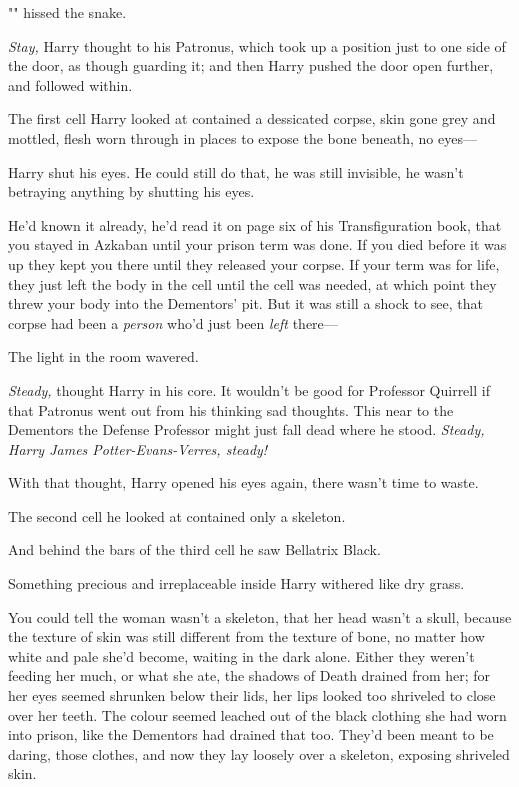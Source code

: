 "" hissed the snake.

\emph{Stay,} Harry thought to his Patronus, which took up a position just to
one side of the door, as though guarding it; and then Harry pushed the door
open further, and followed within.

The first cell Harry looked at contained a dessicated corpse, skin gone grey
and mottled, flesh worn through in places to expose the bone beneath, no eyes---

Harry shut his eyes. He could still do that, he was still invisible, he wasn't
betraying anything by shutting his eyes.

He'd known it already, he'd read it on page six of his Transfiguration book,
that you stayed in Azkaban until your prison term was done. If you died before
it was up they kept you there until they released your corpse. If your term was
for life, they just left the body in the cell until the cell was needed, at
which point they threw your body into the Dementors' pit. But it was still a
shock to see, that corpse had been a \emph{person} who'd just been \emph{left}
there---

The light in the room wavered.

\emph{Steady,} thought Harry in his core. It wouldn't be good for Professor
Quirrell if that Patronus went out from his thinking sad thoughts. This near to
the Dementors the Defense Professor might just fall dead where he stood.
\emph{Steady, Harry James Potter-Evans-Verres, steady!}

With that thought, Harry opened his eyes again, there wasn't time to waste.

The second cell he looked at contained only a skeleton.

And behind the bars of the third cell he saw Bellatrix Black.

Something precious and irreplaceable inside Harry withered like dry grass.

You could tell the woman wasn't a skeleton, that her head wasn't a skull,
because the texture of skin was still different from the texture of bone, no
matter how white and pale she'd become, waiting in the dark alone. Either they
weren't feeding her much, or what she ate, the shadows of Death drained from
her; for her eyes seemed shrunken below their lids, her lips looked too
shriveled to close over her teeth. The colour seemed leached out of the black
clothing she had worn into prison, like the Dementors had drained that too.
They'd been meant to be daring, those clothes, and now they lay loosely over a
skeleton, exposing shriveled skin.

